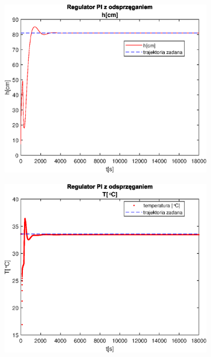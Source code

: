 \begin{figure}[h!]
   \centering
   \begin{subfigure}[b]{0.4\textwidth}
      \includegraphics[width=1\linewidth]{img/PI/decoupler/disturbance/PIDecouplerH1.eps}
      \caption{}
      \label{fig:fig:PIDecoupler11}
   \end{subfigure}
       
   \begin{subfigure}[b]{0.4\textwidth}
      \includegraphics[width=1\linewidth]{img/PI/decoupler/disturbance/PIDecouplerT1.eps}
      \caption{}
      \label{fig:fig:PIDecoupler12}
   \end{subfigure}
       

\end{figure}
